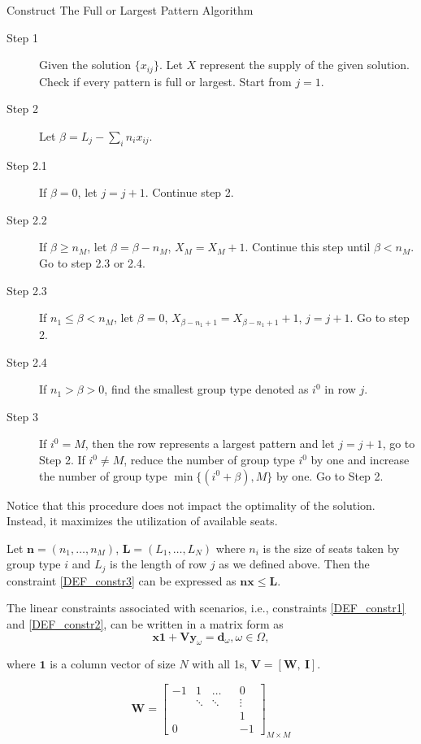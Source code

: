 \begin{algorithm}[H]
  \caption{Construct The Full or Largest Pattern Algorithm}\label{construction}
    \begin{description}
    \item[Step 1] Given the solution $\{x_{ij}\}$. Let $X$ represent the supply of the given solution. Check if every pattern is full or largest. Start from $j =1$. 
    \item[Step 2] Let $\beta = L_{j} - \sum_{i} n_{i} x_{ij}$. 
    \item[Step 2.1] If $\beta = 0$, let $j =j + 1$. Continue step 2.
    \item[Step 2.2] If $\beta \geq n_{M}$, let $\beta = \beta - n_{M}$, $X_{M} = X_{M} + 1$. Continue this step until $\beta < n_{M}$. Go to step 2.3 or 2.4.
    \item[Step 2.3] If $n_{1} \leq \beta < n_{M}$, let $\beta = 0$, $X_{\beta-n_{1}+1} = X_{\beta-n_{1}+1} + 1$, $j = j+1$. Go to step 2. 
    \item[Step 2.4] If $n_{1} > \beta > 0$, find the smallest group type denoted as $i^0$ in row $j$.
    \item[Step 3] If $i^0 = M$, then the row represents a largest pattern and let $j = j +1$, go to Step 2. If $i^0 \neq M$, reduce the number of group type $i^0$ by one and increase the number of group type $\min \{(i^0+\beta), M\}$ by one. Go to Step 2.
   \end{description}
\end{algorithm}

Notice that this procedure does not impact the optimality of the solution. Instead, it maximizes the utilization of available seats.


Let $\mathbf{n} = (n_1, \ldots, n_M)$, $\mathbf{L} = (L_1, \ldots, L_N)$ where $n_i$ is the size of seats taken by group type $i$ and $L_j$ is the length of row $j$ as we defined above. Then the constraint \eqref{DEF_constr3} can be expressed as $\mathbf{n} \mathbf{x} \leq \mathbf{L}$.

The linear constraints associated with scenarios, i.e., constraints \eqref{DEF_constr1} and \eqref{DEF_constr2}, can be written in a matrix form as
\[\mathbf{x} \mathbf{1} + \mathbf{V} \mathbf{y}_\omega = \mathbf{d}_\omega, \omega\in \Omega,\]

where $\mathbf{1}$ is a column vector of size $N$ with all 1s, $\mathbf{V} = [\mathbf{W}, ~\mathbf{I}]$.

$$
\mathbf{W}=\left[\begin{array}{ccccc}
-1 & 1 & \ldots & & 0 \\
& \ddots & \ddots & & \vdots \\
& & & & 1 \\
0 & & & & -1
\end{array}\right]_{M \times M}
$$

